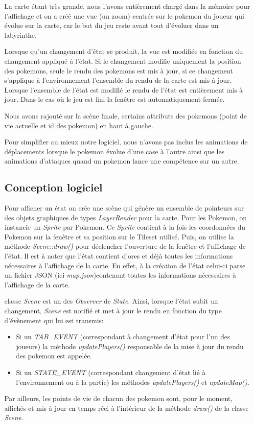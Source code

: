 \documentclass[a4paper,12pt]{article}
\begin{document}
La carte étant très grande, nous l'avons entièrement chargé dans la mémoire pour l'affichage et on a créé une vue (un zoom) centrée sur le pokemon du joueur qui évolue sur la carte, car le but du jeu reste avant tout d'évoluer dans un labyrinthe.
     
Lorsque qu'un changement d'état se produit, la vue est modifiée en fonction du changement appliqué à l'état. Si le changement modifie uniquement la position des pokemons, seule le rendu des pokemons est mis à jour, si ce changement s'applique à l'environnement l'ensemble du rendu de la carte est mis à jour. Lorsque l'ensemble de l'état est modifié le rendu de l'état est entièrement mis à jour. Dans le cas où le jeu est fini la fenêtre est automatiquement fermée.

Nous avons rajouté sur la scène finale, certains attributs des pokemons (point de vie actuelle et id des pokemon) en haut à gauche. 
        
Pour simplifier au mieux notre logiciel, nous n'avons pas inclus les animations de déplacements lorsque le pokemon évolue d'une case à l'autre ainsi que les animations d'attaques quand un pokemon lance une compétence sur un autre.


    \subsection{Conception logiciel}
Pour afficher un état on crée une scène qui génère un ensemble de pointeurs sur des objets graphiques de types \emph{LayerRender} pour la carte.
Pour les Pokemon, on instancie un \emph{Sprite} par Pokemon. Ce \emph{Sprite} contient à la fois les coordonnées du Pokemon sur la fenêtre et sa position sur le Tileset utilisé. Puis, on utilise la méthode \emph{Scene::draw()} pour déclencher l'ouverture de la fenêtre et l'affichage de l'état.
Il est à noter que l'état contient d'ores et déjà toutes les informations nécessaires à l'affichage de la carte. En effet, à la création de l'état celui-ci parse un fichier JSON (ici \emph{map.json})contenant toutes les informations nécessaires à l'affichage de la carte.

 classe \emph{Scene} est un des \emph{Observer} de \emph{State}. Ainsi, lorsque l'état subit un changement, \emph{Scene} est notifié et met à jour le rendu en fonction du type d'évènement qui lui est transmis:
\begin{itemize}
\item Si un \emph{TAB\_EVENT} (correspondant à changement d'état pour l'un des joueurs) la méthode \emph{updatePlayers()} responsable de la mise à jour du rendu des pokemon est appelée.
\item Si un \emph{STATE\_EVENT} (correspondant changement d'état lié à l'environnement ou à la partie) les méthodes \emph{updatePlayers()} et \emph{updateMap()}.
\end{itemize}
Par ailleurs, les points de vie de chacun des pokemon sont, pour le moment, affichés et mis à jour en temps réel à l'intérieur de la méthode \emph{draw()} de la classe \emph{Scene}.
\end{document}
